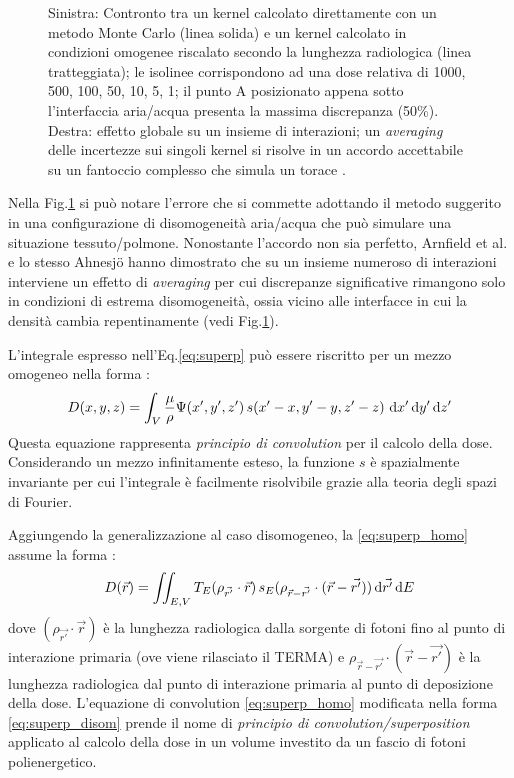 {\begin{figure}[!t]
\caption{Sinistra: Contronto tra un kernel calcolato direttamente con un metodo Monte Carlo (linea solida) e un kernel calcolato in condizioni omogenee riscalato secondo la lunghezza radiologica (linea tratteggiata); le isolinee corrispondono ad una dose relativa di 1000, 500, 100, 50, 10, 5, 1; il punto A posizionato appena sotto l'interfaccia aria/acqua presenta la massima discrepanza (50\%). Destra: effetto globale su un insieme di interazioni; un \textit{averaging} delle incertezze sui singoli kernel si risolve in un accordo accettabile su un fantoccio complesso che simula un torace \cite{Woo1990,Arnfield2000,Ahnesjo1989}.}
\label{fig:kern_dens}
\end{figure}
Nella Fig.\ref{fig:kern_dens} si può notare l'errore che si commette adottando il metodo suggerito in una configurazione di disomogeneità aria/acqua che può simulare una situazione tessuto/polmone. Nonostante l'accordo non sia perfetto, Arnfield et al. \cite{Arnfield2000} e lo stesso Ahnesj\"{o} \cite{Ahnesjo1989} hanno dimostrato che su un insieme numeroso di interazioni interviene un effetto di \textit{averaging} per cui discrepanze significative rimangono solo in condizioni di estrema disomogeneità, ossia vicino alle interfacce in cui la densità cambia repentinamente (vedi Fig.\ref{fig:kern_dens}).

L'integrale espresso nell'Eq.\ref{eq:superp} può essere riscritto per un mezzo omogeneo nella forma \cite{Khan2010}:
\begin{equation}
D(x,y,z) =  \int_V \frac{\mu}{\rho} \Psi(x',y',z')\,s(x'- x, y'- y, z'- z)\, \,\text{d} x' \,\text{d} y' \,\text{d} z'
\label{eq:superp_homo}
\end{equation}
Questa equazione rappresenta \textit{principio di convolution} per il calcolo della dose. Considerando un mezzo infinitamente esteso, la funzione $s$ è spazialmente invariante per cui l'integrale è facilmente risolvibile grazie alla teoria degli spazi di Fourier.

Aggiungendo la generalizzazione al caso disomogeneo, la \eqref{eq:superp_homo} assume la forma \cite{Khan2010}:
\begin{equation}
D(\vec{r}) = \iint_{E,V} T_E(\rho_{\vec{r'}} \cdot \vec{r})\, s_E(\rho_{\vec{r}-\vec{r'}}\cdot (\vec{r}-\vec{r'}))\,\text{d}\vec{r'} \,\text{d} E
\label{eq:superp_disom}
\end{equation}
dove $(\rho_{\vec{r'}} \cdot \vec{r})$ è la lunghezza radiologica dalla sorgente di fotoni fino al punto di interazione primaria (ove viene rilasciato il TERMA) e $\rho_{\vec{r}-\vec{r'}}\cdot (\vec{r}-\vec{r'})$ è la lunghezza radiologica dal punto di interazione primaria al punto di deposizione della dose. L'equazione di convolution \eqref{eq:superp_homo} modificata nella forma \eqref{eq:superp_disom} prende il nome di \textit{principio di convolution/superposition} applicato al calcolo della dose in un volume investito da un fascio di fotoni polienergetico.

}
